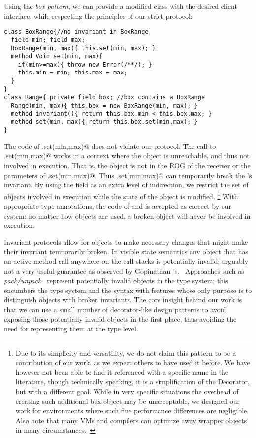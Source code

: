 Using the \emph{box pattern}, we can provide a modified
\Q@Range@ class with the desired client interface, while respecting the principles of our strict protocol:
\begin{lstlisting}
class BoxRange{//no invariant in BoxRange
  field min; field max;
  BoxRange(min, max){ this.set(min, max); }
  method Void set(min, max){
    if(min>=max){ throw new Error(/**/); }
    this.min = min; this.max = max;
  }
}
class Range{ private field box; //box contains a BoxRange
  Range(min, max){ this.box = new BoxRange(min, max); }
  method invariant(){ return this.box.min < this.box.max; }
  method set(min, max){ return this.box.set(min,max); }
}
\end{lstlisting}
The code of \Q@Range.set(min,max)@ does not violate our protocol.
The call to
\Q@BoxRange.set(min,max)@ works in a context where the \Q@Range@ object is
unreachable, and thus not involved in execution.
That is, the \Q@Range@ object is not in the ROG of the receiver or the parameters of \Q@BoxRange.set(min,max)@.
 Thus \Q@Range.set(min,max)@ can temporarily break the \Q@Range@'s invariant.
By using the \Q@box@ field as an extra level of indirection, we restrict the set of objects involved in execution while the state of the object \Q@Range@ is modified.%
\footnote{Due to its simplicity and versatility, we do not claim this pattern to be a contribution of our work, as we expect others to have used it before. We have however not been able to find it referenced with a specific name in the literature, though technically speaking, it is a simplification of the Decorator, but with a different goal.
While in very specific situations the overhead of creating such additional box object may be unacceptable, we designed our work for environments where such fine performance differences are negligible.
Also note that many VMs and compilers can optimize away wrapper objects in many circumstances.~\cite{Bolz:2011:ARP:1929501.1929508}}
With appropriate type annotations, the code of \Q@Range@ and \Q@BoxRange@ is accepted as correct by our system: no matter how \Q@Range@ objects are used, a broken \Q@Range@ object will never be involved in execution.

Invariant protocols allow for objects to make necessary changes that might make their invariant temporarily broken.
In visible state semantics any object that has an active method call anywhere on the call stacks is potentially invalid;
arguably not a very useful guarantee as observed by
Gopinathan \etal's.~\cite{Gopinathan:2008:RMO:1483018.1483028}
Approaches such as \textit{pack/unpack}~\cite{DBLP:journals/jot/BarnettDFLS04} 
represent potentially invalid objects in the type system; this
encumbers the type system and the syntax with features whose only purpose is to distinguish objects with broken invariants.
The core insight behind our work 
is that we can use a small number of decorator-like design patterns to avoid exposing those potentially invalid objects 
in the first place, thus avoiding the need for representing them at the type level.

